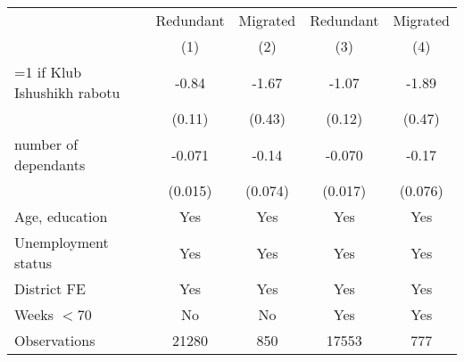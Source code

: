 \begin{tabular}{l*{4}{c}}
\toprule
               & Redundant & Migrated & Redundant & Migrated \\ 
               \cmidrule{2-5} &\multicolumn{1}{c}{(1)}&\multicolumn{1}{c}{(2)}&\multicolumn{1}{c}{(3)}&\multicolumn{1}{c}{(4)}\\
\midrule
=1 if Klub Ishushikh rabotu&    -0.84&    -1.67&    -1.07&    -1.89\\
                &   (0.11)&   (0.43)&   (0.12)&   (0.47)\\
\addlinespace
number of dependants&   -0.071&    -0.14&   -0.070&    -0.17\\
                &  (0.015)&  (0.074)&  (0.017)&  (0.076)\\
\midrule
Age, education & Yes & Yes & Yes & Yes \\
Unemployment status & Yes & Yes & Yes & Yes \\
District FE & Yes & Yes & Yes & Yes \\
Weeks $< 70$ & No & No & Yes & Yes \\
\midrule
Observations    &    21280&      850&    17553&      777\\
\bottomrule
\end{tabular}
